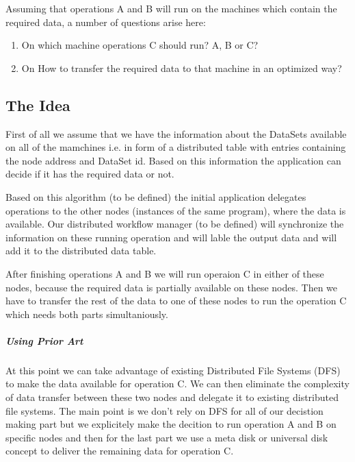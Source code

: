 Assuming that operations A and B will run on the machines which
contain the required data, a number of questions arise here:
\begin{enumerate}
\item On which machine operations C should run? A, B or C?
\item On How to transfer the required data to that machine in an 
optimized way?
\end{enumerate}

\subsection{The Idea}
First of all we assume that we have the information about the DataSets
available on all of the mamchines i.e. in form of a distributed table
with entries containing the node address and DataSet id. Based on this
information the application can decide if it has the required data or
not. 

Based on this algorithm (to be defined) the initial application
delegates operations to the other nodes (instances of the same program),
where the data is available. Our distributed workflow manager (to be 
defined) will synchronize the information on these running operation and
will lable the output data and will add it to the distributed data table.

After finishing operations A and B we will run operaion C in either
of these nodes, because the required data is partially available on these
nodes. Then we have to transfer the rest of the data to one of these
nodes to run the operation C which needs both parts simultaniously.

\subparagraph{Using Prior Art}
At this point we can take advantage of existing Distributed File Systems
(DFS) to make the data available for operation C. We can then eliminate
the complexity of data transfer between these two nodes and delegate it
to existing distributed file systems. The main point is we don't rely on
DFS for all of our decistion making part but we explicitely make the 
decition to run operation A and B on specific nodes and then for the 
last part we use a meta disk or universal disk concept to deliver the
remaining data for operation C.